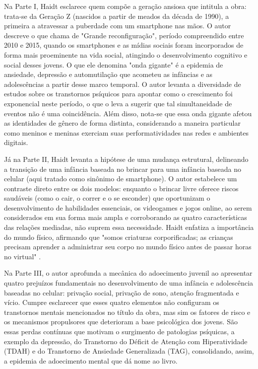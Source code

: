 \documentclass[portuguese]{textolivre}
\begin{document}
Na Parte I, Haidt esclarece quem compõe a geração ansiosa que intitula a obra: trata-se da Geração Z (nascidos a partir de meados da década de 1990), a primeira a atravessar a puberdade com um smartphone nas mãos. O autor descreve o que chama de "Grande reconfiguração", período compreendido entre 2010 e 2015, quando os smartphones e as mídias sociais foram incorporados de forma mais proeminente na vida social, atingindo o desenvolvimento cognitivo e social desses jovens. O que ele denomina "onda gigante" é a epidemia de ansiedade, depressão e automutilação que acometeu as infâncias e as adolescências a partir desse marco temporal. O autor levanta a diversidade de estudos sobre os transtornos psíquicos para apontar como o crescimento foi exponencial neste período, o que o leva a sugerir que tal simultaneidade de eventos não é uma coincidência. Além disso, nota-se que essa onda gigante afetou as identidades de gênero de forma distinta, considerando a maneira particular como meninos e meninas exerciam suas performatividades nas redes e ambientes digitais.

Já na Parte II, Haidt levanta a hipótese de uma mudança estrutural, delineando a transição de uma infância baseada no brincar para uma infância baseada no celular (aqui tratado como sinônimo de smartphone). O autor estabelece um contraste direto entre os dois modelos: enquanto o brincar livre oferece riscos saudáveis (como o cair, o correr e o se esconder) que oportunizam o desenvolvimento de habilidades essenciais, os videogames e jogos online, ao serem considerados em sua forma mais ampla e corroborando as quatro características das relações mediadas, não suprem essa necessidade. Haidt enfatiza a importância do mundo físico, afirmando que "somos criaturas corporificadas; as crianças precisam aprender a administrar seu corpo no mundo físico antes de passar horas no virtual" \cite[p. 95]{haidt2024geracao}.

Na Parte III, o autor aprofunda a mecânica do adoecimento juvenil ao apresentar quatro prejuízos fundamentais no desenvolvimento de uma infância e adolescência baseadas no celular: privação social, privação de sono, atenção fragmentada e vício. Cumpre esclarecer que esses quatro elementos não configuram os transtornos mentais mencionados no título da obra, mas sim os fatores de risco e os mecanismos propulsores que deterioram a base psicológica dos jovens. São essas perdas contínuas que motivam o surgimento de patologias psíquicas, a exemplo da depressão, do Transtorno do Déficit de Atenção com Hiperatividade (TDAH) e do Transtorno de Ansiedade Generalizada (TAG), consolidando, assim, a epidemia de adoecimento mental que dá nome ao livro.
\end{document}
